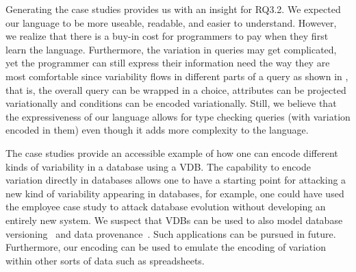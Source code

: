 Generating the case studies provides us with an insight for RQ3.2.
%
%
We expected our language to be more useable, readable, and
easier to understand. However, we realize that there is a buy-in cost
for programmers to pay when they first learn the language. Furthermore,
the variation in queries may get complicated, yet the programmer can 
still express their information need the way they are most comfortable
since variability flows in different parts of a query as shown in , 
that is, the overall query
can be wrapped in a choice, attributes can be projected variationally and
conditions can be encoded variationally. 
Still, we believe that the expressiveness of our
language allows for type checking queries (with variation encoded in them)
even though it adds more complexity 
to the language.

%
%
The case studies provide an accessible example of how one can encode different 
kinds of variability in a database using a VDB. 
The capability to encode variation directly in databases allows one to have a 
starting point for attacking a new kind of variability appearing in databases,
for example, one could have used the employee case study to attack database 
evolution without developing an entirely new system. 
We suspect that VDBs can be used to also model database 
versioning~\cite{datasetVersioning,dbVersioning} and
data provenance~\cite{bt07sigmod}. Such applications can be pursued in future.
%
Furthermore, our encoding can be used to emulate the encoding of 
 variation within other sorts of data such as spreadsheets.
 
